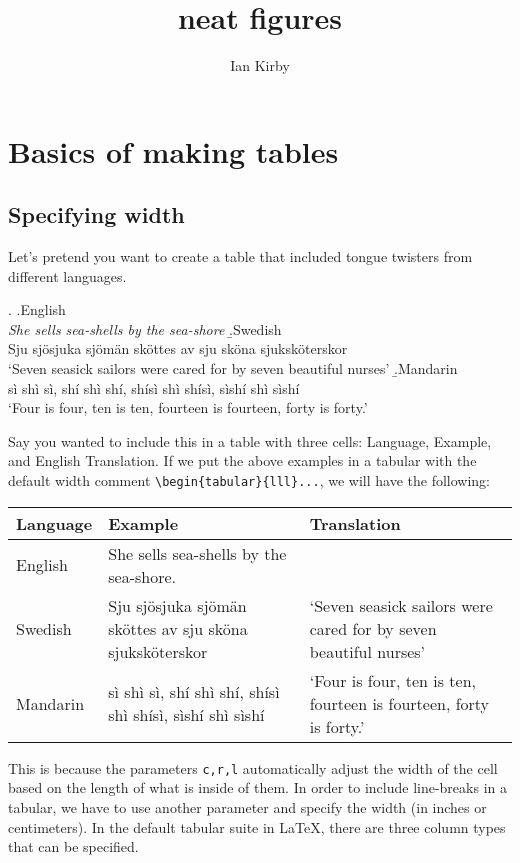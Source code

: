 \documentclass[11pt]{article}
\title{neat figures}
\author{Ian Kirby}
\date{}
\newcommand{\strt}{\noindent{$\bullet$} }
\begin{document}
\maketitle


\section{Basics of making tables}



\subsection{Specifying width}

\strt Let's pretend you want to create a table that included tongue twisters from different languages.

\ex.
\a.English\\\textit{She sells sea-shells by the sea-shore}
\b.Swedish\\Sju sjösjuka sjömän sköttes av sju sköna sjuksköterskor\\`Seven seasick sailors were cared for by seven beautiful nurses'
\b.Mandarin\\ sì shì sì, shí shì shí, shísì shì shísì, sìshí shì sìshí\\`Four is four, ten is ten, fourteen is fourteen, forty is forty.' 


\strt Say you wanted to include this in a table with three cells: Language, Example, and English Translation.  If we put the above examples in a tabular with the default width comment \texttt{\textbackslash begin\{tabular\}\{lll\}...}, we will have the following:


\bigskip 

\begin{tabular}{lll}
    \hline Language & Example & Translation\\\hline 
    English & She sells sea-shells by the sea-shore. & \\\hline
    Swedish & Sju sjösjuka sjömän sköttes av sju sköna sjuksköterskor & `Seven seasick sailors were cared for by seven beautiful nurses'\\\hline 
    Mandarin & sì shì sì, shí shì shí, shísì shì shísì, sìshí shì sìshí & `Four is four, ten is ten, fourteen is fourteen, forty is forty.' \\\hline 
\end{tabular}

\bigskip 

\strt This is because the parameters \texttt{c,r,l} automatically adjust the width of the cell based on the length of what is inside of them.  In order to include line-breaks in a tabular, we have to use another parameter and specify the width (in inches or centimeters).  In the default tabular suite in LaTeX, there are three column types that can be specified.
\end{document}
